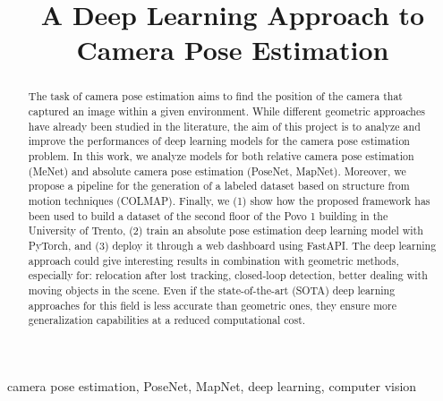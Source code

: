 \documentclass[conference]{IEEEtran}
\begin{document}
\title{A Deep Learning Approach to Camera Pose Estimation}

\author{
\and
{}
}

\maketitle

\thispagestyle{plain}
\pagestyle{plain}

\begin{abstract}
The task of camera pose estimation aims to find the position of the camera that captured an image within a given environment.
While different geometric approaches have already been studied in the literature, the aim of this project is to analyze and improve the performances of deep learning models for the camera pose estimation problem.
In this work, we analyze models for both relative camera pose estimation (MeNet) and absolute camera pose estimation (PoseNet, MapNet). Moreover, we propose a pipeline for the generation of a labeled dataset based on structure from motion techniques (COLMAP).
Finally, we (1) show how the proposed framework has been used to build a dataset of the second floor of the Povo 1 building in the University of Trento, (2) train an absolute pose estimation deep learning model with PyTorch, and (3) deploy it through a web dashboard using FastAPI.
The deep learning approach could give interesting results in combination with geometric methods, especially for: relocation after lost tracking, closed-loop detection, better dealing with moving objects in the scene. Even if the state-of-the-art (SOTA) deep learning approaches for this field is less accurate than geometric ones, they ensure more generalization capabilities at a reduced  computational cost.
\end{abstract}

\begin{IEEEkeywords}
camera pose estimation, PoseNet, MapNet, deep learning, computer vision
\end{IEEEkeywords}









{}

\end{document}
